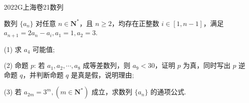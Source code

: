 
\begin{problem}{2022}{G}{上海卷}{21}{数列}

数列 $\{a_n\}$ 对任意 $n \in \mathbf{N}^*$，且 $n \geqslant 2$，均存在正整数 $i \in [1, n-1]$，满足 $a_{n+1}=2a_n-a_i, a_1=1, a_2=3$.

(1) 求 $a_4$ 可能值;

(2) 命题 $p$: 若 $a_1, a_2, \cdots, a_8$ 成等差数列，则 $a_9<30$，证明 $p$ 为真，同时写出 $p$ 逆命题 $q$，并判断命题 $q$ 是真是假，说明理由;

(3) 若 $a_{2m}=3^m, (m \in \mathbf{N}^*)$ 成立，求数列 $\{a_n\}$ 的通项公式.

\end{problem}